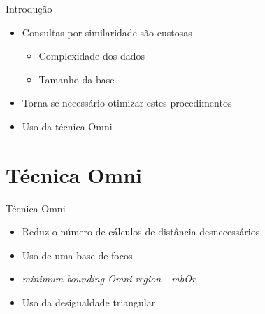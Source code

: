 \documentclass{beamer}
\begin{document}
\begin{frame}{Introdução}

  \begin{itemize}
   \item Consultas por similaridade são custosas\newline
   
   \begin{itemize}
      \item Complexidade dos dados\newline
      \item Tamanho da base\newline
   \end{itemize}
   
   \item Torna-se necessário otimizar estes procedimentos\newline
   
   \item Uso da técnica Omni
  \end{itemize}

 
\end{frame}

\section{Técnica Omni}

\begin{frame}{Técnica Omni}

  \begin{itemize}
   \item Reduz o número de cálculos de distância desnecessários\newline
   
   \item Uso de uma base de focos\newline
   
   \item \textit{minimum bounding Omni region - mbOr}\newline
   
   \item Uso da desigualdade triangular

  \end{itemize}

 
\end{frame}
\end{document}
